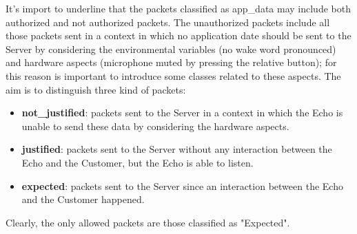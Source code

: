 \documentclass[sigconf]{acmart}
\begin{document}
    It's import to underline that the packets classified as app\_data may include both authorized and not authorized packets.
    The unauthorized packets include all those packets sent in a context in which no application date should be sent to the Server by considering the environmental variables (no wake word pronounced) and hardware aspects (microphone muted by pressing the relative button); for this reason is important to introduce some classes related to these aspects.
    The aim is to distinguish three kind of packets:
    \begin{itemize}
        \item \textbf{not\_justified}: packets sent to the Server in a context in which the Echo is unable to send these data by considering the hardware aspects.
        \item \textbf{justified}: packets sent to the Server without any interaction between the Echo and the Customer, but the Echo is able to listen.
        \item \textbf{expected}: packets sent to the Server since an interaction between the Echo and the Customer happened.
    \end{itemize}
    Clearly, the only allowed packets are those classified as "Expected".
\end{document}
